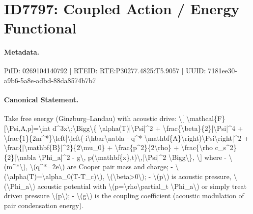 \section*{ID7797: Coupled Action / Energy Functional}
\paragraph{Metadata.}
PiID: 0269104140792 | RTEID: RTE:P30277.4825:T5.9057 | UUID: 7181ee30-a9b6-5a8e-adbd-88da8574b7b7

\paragraph{Canonical Statement.}
Take free energy (Ginzburg–Landau) with acoustic drive: \textbackslash{}[ \textbackslash{}mathcal\{F\}[\textbackslash{}Psi,A,p]=\textbackslash{}int d\textasciicircum{}3x\textbackslash{};\textbackslash{}Bigg\textbackslash{}\{ \textbackslash{}alpha(T)|\textbackslash{}Psi|\textasciicircum{}2 + \textbackslash{}frac\{\textbackslash{}beta\}\{2\}|\textbackslash{}Psi|\textasciicircum{}4 + \textbackslash{}frac\{1\}\{2m\textasciicircum{}*\}\textbackslash{}left|\textbackslash{}left(-i\textbackslash{}hbar\textbackslash{}nabla - q\textasciicircum{}* \textbackslash{}mathbf\{A\}\textbackslash{}right)\textbackslash{}Psi\textbackslash{}right|\textasciicircum{}2 + \textbackslash{}frac\{|\textbackslash{}mathbf\{B\}|\textasciicircum{}2\}\{2\textbackslash{}mu\_0\} + \textbackslash{}frac\{p\textasciicircum{}2\}\{2\textbackslash{}rho\} + \textbackslash{}frac\{\textbackslash{}rho c\_s\textasciicircum{}2\}\{2\}|\textbackslash{}nabla \textbackslash{}Phi\_a|\textasciicircum{}2 - g\textbackslash{}, p(\textbackslash{}mathbf\{x\},t)\textbackslash{},|\textbackslash{}Psi|\textasciicircum{}2 \textbackslash{}Bigg\textbackslash{}\}, \textbackslash{}] where - \textbackslash{}(m\textasciicircum{}*\textbackslash{}), \textbackslash{}(q\textasciicircum{}*=2e\textbackslash{}) are Cooper pair mass and charge; - \textbackslash{}(\textbackslash{}alpha(T)=\textbackslash{}alpha\_0(T-T\_c)\textbackslash{}), \textbackslash{}(\textbackslash{}beta>0\textbackslash{}); - \textbackslash{}(p\textbackslash{}) is acoustic pressure, \textbackslash{}(\textbackslash{}Phi\_a\textbackslash{}) acoustic potential with \textbackslash{}(p=\textbackslash{}rho\textbackslash{}partial\_t \textbackslash{}Phi\_a\textbackslash{}) or simply treat driven pressure \textbackslash{}(p\textbackslash{}); - \textbackslash{}(g\textbackslash{}) is the coupling coefficient (acoustic modulation of pair condensation energy).

